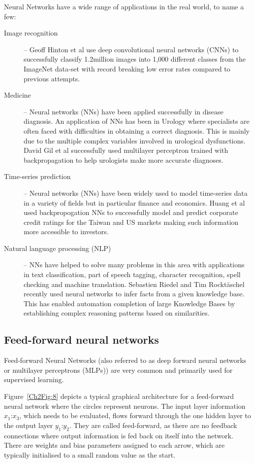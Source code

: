Neural Networks have a wide range of applications in the real world, to name a few:
\begin{description}
    \item[Image recognition] -- Geoff Hinton et al \autocite{krizhevsky2012imagenet} use deep convolutional neural networks (CNNs) to successfully classify 1.2million images into 1,000 different classes from the ImageNet data-set with record breaking low error rates compared to previous attempts.
    \item[Medicine] -- Neural networks (NNs) have been applied successfully in disease diagnosis. An application of NNs has been in Urology where specialists are often faced with difficulties in obtaining a correct diagnosis. This is mainly due to the multiple complex variables involved in urological dysfunctions. David Gil et al \autocite{gil2009application} successfully used multilayer perceptron trained with backpropagation to help urologists make more accurate diagnoses.
    \item[Time-series prediction] -- Neural networks (NNs) have been widely used to model time-series data in a variety of fields but in particular finance and economics. Huang et al \autocite{huang2004credit} used backpropogation NNs to successfully model and predict corporate credit ratings for the Taiwan and US markets making such information more accessible to investors.
    \item[Natural language processing (NLP)] -- NNs have helped to solve many problems in this area with applications in text classification, part of speech tagging, character recognition, spell checking and machine translation. Sebastien Riedel and Tim Rockt\"aschel \autocite{rocktaschel2017end} recently used neural networks to infer facts from a given knowledge base. This has enabled automation completion of large Knowledge Bases by establishing complex reasoning patterns based on similarities.
\end{description}



\subsection{Feed-forward neural networks}\label{feedfwdnn}

Feed-forward Neural Networks (also referred to as deep forward neural networks or multilayer perceptrons (MLPs)) are very common and primarily used for supervised learning.

Figure~\ref{Ch2Fig:8} depicts a typical graphical architecture for a feed-forward neural network where the circles represent neurons. The input layer information $x_1\text{:}x_3$, which needs to be evaluated, flows forward through the one hidden layer to the output layer $y_1\text{:}y_2$. They are called feed-forward, as there are no feedback connections where output information is fed back on itself into the network. There are weights and bias parameters assigned to each arrow, which are typically initialised to a small random value as the start.


